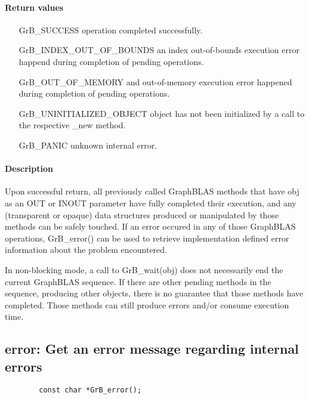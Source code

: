 \paragraph{Return values}
\begin{itemize}[leftmargin=2.1in]
	\item[{\sf GrB\_SUCCESS}]			operation completed successfully.
	\item[{\sf GrB\_INDEX\_OUT\_OF\_BOUNDS}]	an index out-of-bounds execution error happend during completion of pending operations.
	\item[{\sf GrB\_OUT\_OF\_MEMORY}]		and out-of-memory execution error happened during completion of pending operations.
	\item[{\sf GrB\_UNINITIALIZED\_OBJECT}]		object has not been initialized by a call to the respective {\sf *\_new} method.
	\item[{\sf GrB\_PANIC}]				unknown internal error.
\end{itemize}

\paragraph{Description}

Upon successful return, all previously called GraphBLAS methods that
have {\sf obj} as an {\sf OUT} or {\sf INOUT} parameter have fully
completed their execution, and any (transparent or opaque) data structures
produced or manipulated by those methods can be safely touched.  If an
error occured in any of those GraphBLAS operations, {\sf GrB\_error()}
can be used to retrieve implementation defined error information about
the problem encountered.

In non-blocking mode, a call to {\sf GrB\_wait(obj)} does not necessarily
end the current GraphBLAS sequence. If there are other pending methods
in the sequence, producing other objects, there is no guarantee that
those methods have completed. Those methods can still produce errors
and/or consume execution time.

\subsection{{\sf error}: Get an error message regarding internal errors}

\begin{verbatim}
        const char *GrB_error();
\end{verbatim}


